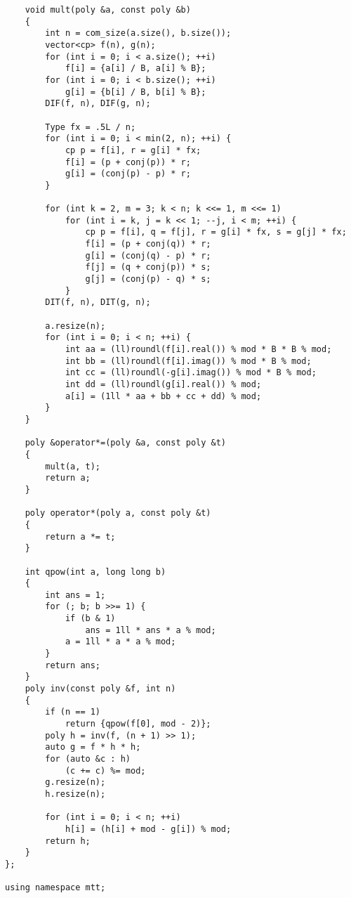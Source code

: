 \documentclass[twocolumn,a4]{article}
\begin{document}
\begin{lstlisting}
    void mult(poly &a, const poly &b)
    {
        int n = com_size(a.size(), b.size());
        vector<cp> f(n), g(n);
        for (int i = 0; i < a.size(); ++i)
            f[i] = {a[i] / B, a[i] % B};
        for (int i = 0; i < b.size(); ++i)
            g[i] = {b[i] / B, b[i] % B};
        DIF(f, n), DIF(g, n);

        Type fx = .5L / n;
        for (int i = 0; i < min(2, n); ++i) {
            cp p = f[i], r = g[i] * fx;
            f[i] = (p + conj(p)) * r;
            g[i] = (conj(p) - p) * r;
        }

        for (int k = 2, m = 3; k < n; k <<= 1, m <<= 1)
            for (int i = k, j = k << 1; --j, i < m; ++i) {
                cp p = f[i], q = f[j], r = g[i] * fx, s = g[j] * fx;
                f[i] = (p + conj(q)) * r;
                g[i] = (conj(q) - p) * r;
                f[j] = (q + conj(p)) * s;
                g[j] = (conj(p) - q) * s;
            }
        DIT(f, n), DIT(g, n);

        a.resize(n);
        for (int i = 0; i < n; ++i) {
            int aa = (ll)roundl(f[i].real()) % mod * B * B % mod;
            int bb = (ll)roundl(f[i].imag()) % mod * B % mod;
            int cc = (ll)roundl(-g[i].imag()) % mod * B % mod;
            int dd = (ll)roundl(g[i].real()) % mod;
            a[i] = (1ll * aa + bb + cc + dd) % mod;
        }
    }

    poly &operator*=(poly &a, const poly &t)
    {
        mult(a, t);
        return a;
    }

    poly operator*(poly a, const poly &t)
    {
        return a *= t;
    }

    int qpow(int a, long long b)
    {
        int ans = 1;
        for (; b; b >>= 1) {
            if (b & 1)
                ans = 1ll * ans * a % mod;
            a = 1ll * a * a % mod;
        }
        return ans;
    }
    poly inv(const poly &f, int n)
    {
        if (n == 1)
            return {qpow(f[0], mod - 2)};
        poly h = inv(f, (n + 1) >> 1);
        auto g = f * h * h;
        for (auto &c : h)
            (c += c) %= mod;
        g.resize(n);
        h.resize(n);

        for (int i = 0; i < n; ++i)
            h[i] = (h[i] + mod - g[i]) % mod;
        return h;
    }
};

using namespace mtt;
\end{lstlisting}
\end{document}

